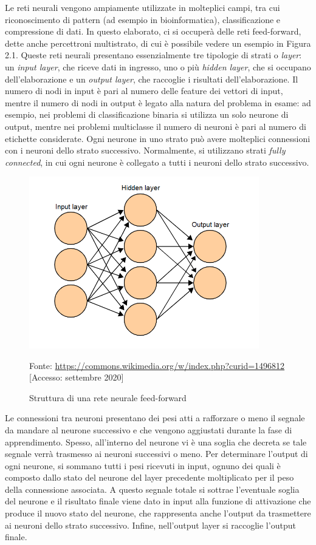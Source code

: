 \documentclass[11pt,  oneside, openany]{book}
\newcommand{\source}[1]{\caption*{Fonte: {#1}} }
\begin{document}
Le reti neurali vengono ampiamente utilizzate in molteplici campi, tra cui riconoscimento di pattern (ad esempio in bioinformatica), classificazione e compressione di dati. In questo elaborato, ci si occuperà delle reti feed-forward, dette anche percettroni multistrato, di cui è possibile vedere  un esempio in Figura 2.1. Queste reti neurali presentano essenzialmente tre tipologie di strati o \textit{layer}: un \textit{input layer}, che riceve dati in ingresso, uno o più \textit{hidden layer}, che si occupano dell'elaborazione e un \textit{output layer}, che raccoglie i risultati dell'elaborazione. Il numero di nodi in input è pari al numero delle feature dei vettori di input, mentre il numero di nodi in output è legato alla natura del problema in esame: ad esempio, nei problemi di classificazione binaria si utilizza un solo neurone di output, mentre nei problemi multiclasse il numero di neuroni è pari al numero di etichette considerate.  Ogni neurone in uno strato può avere molteplici connessioni con i neuroni dello strato successivo. Normalmente, si utilizzano strati \textit{fully connected}, in cui ogni neurone è collegato a tutti i neuroni dello strato successivo. 

\begin{figure}[h!]
\begin{center}
  \includegraphics[width=10cm]{Immagini/ReteNeurale.png}\\
  \caption{Struttura di una rete neurale feed-forward}
  \source{\url{https://commons.wikimedia.org/w/index.php?curid=1496812} [Accesso: settembre 2020]}
\end{center}
\end{figure}

Le connessioni tra neuroni presentano dei pesi atti a rafforzare o meno il segnale da mandare al neurone successivo e che vengono aggiustati durante la fase di apprendimento. Spesso, all'interno del neurone vi è una soglia che decreta se tale segnale verrà trasmesso ai neuroni successivi o meno. Per determinare l'output di ogni neurone, si sommano tutti i pesi ricevuti in input, ognuno dei quali è composto dallo stato del neurone del layer precedente moltiplicato per il peso della connessione associata. A questo segnale totale si sottrae l'eventuale soglia del neurone e il risultato finale viene dato in input alla funzione di attivazione che produce il nuovo stato del neurone, che rappresenta anche l'output da trasmettere ai neuroni dello strato successivo. Infine, nell'output layer si raccoglie l'output finale. 
\end{document}
